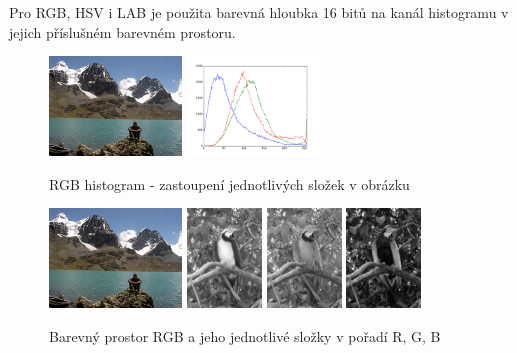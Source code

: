 \documentclass[czech,BP]{thesiskiv}
\begin{document}
Pro RGB, HSV i LAB je použita barevná hloubka 16 bitů na kanál histogramu v jejich příslušném barevném prostoru. 

\begin{figure}[ht]
		\centering
		\includegraphics[height=100px]{./img/img_histogram.jpg}	
		\includegraphics[height=100px]{./img/bgr_histogram.png}	
		\caption{RGB histogram - zastoupení jednotlivých složek v obrázku}
\end{figure}

\begin{figure}[ht]
		\centering
		\includegraphics[height=100px]{./img/img_histogram.jpg}
		\includegraphics[height=100px]{./img/bgr_r.jpg}
		\includegraphics[height=100px]{./img/bgr_g.jpg}
		\includegraphics[height=100px]{./img/bgr_b.jpg}	
		\caption{Barevný prostor RGB a jeho jednotlivé složky v pořadí R, G, B}
\end{figure}
\end{document}
